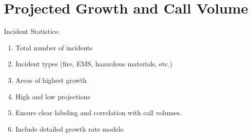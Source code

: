 \chapter{Projected Growth and Call Volume}
\label{chap:growth_analysis}

Incident Statistics:

\begin{enumerate}
    \item Total number of incidents
    \item Incident types (fire, EMS, hazardous materials, etc.)
    \item Areas of highest growth
    \item High and low projections
    \item Ensure clear labeling and correlation with call volumes.
    \item Include detailed growth rate models.
\end{enumerate}